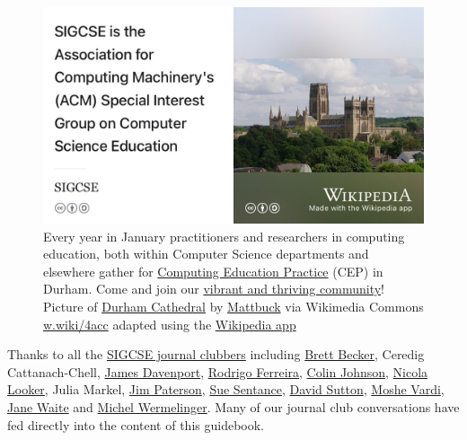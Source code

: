 \documentclass[
]{book}
\begin{document}
\begin{figure}

{\centering \includegraphics[width=0.99\linewidth]{images/sigcse} 

}

\caption{Every year in January practitioners and researchers in computing education, both within Computer Science departments and elsewhere gather for \href{https://cepconference.webspace.durham.ac.uk/}{Computing Education Practice} (CEP) in Durham. Come and join our \href{https://uki-sigcse.acm.org/practice/}{vibrant and thriving community}! Picture of \href{https://en.wikipedia.org/wiki/Durham_Cathedral}{Durham Cathedral} by \href{https://commons.wikimedia.org/wiki/User:Mattbuck}{Mattbuck} via Wikimedia Commons \href{https://w.wiki/4acc}{w.wiki/4acc} adapted using the \href{https://apps.apple.com/us/app/wikipedia/id324715238}{Wikipedia app}}\label{fig:sigcse-fig}
\end{figure}



Thanks to all the \href{https://sigcse.cs.manchester.ac.uk}{SIGCSE journal clubbers} including \href{https://www.brettbecker.com/}{Brett Becker}, Ceredig Cattanach-Chell, \href{https://en.wikipedia.org/wiki/James_H._Davenport}{James Davenport}, \href{https://riceacademy.rice.edu/junior-fellows/dr-rodrigo-ferreira}{Rodrigo Ferreira}, \href{https://www.nottingham.ac.uk/computerscience/people/colin.johnson}{Colin Johnson}, \href{https://www.gla.ac.uk/pgrs/nicolalooker/}{Nicola Looker}, Julia Markel, \href{https://www.gcu.ac.uk/cebe/staff/jim\%20paterson/}{Jim Paterson}, \href{https://en.wikipedia.org/wiki/Sue_Sentance}{Sue Sentance}, \href{https://www.brookes.ac.uk/templates/pages/staff.aspx?uid=p0073862}{David Sutton}, \href{https://en.wikipedia.org/wiki/Moshe_Vardi}{Moshe Vardi}, \href{http://eecs.qmul.ac.uk/profiles/waitejanelisa.html}{Jane Waite} and \href{https://www.open.ac.uk/people/mw4687}{Michel Wermelinger}. Many of our journal club conversations have fed directly into the content of this guidebook.
\end{document}
